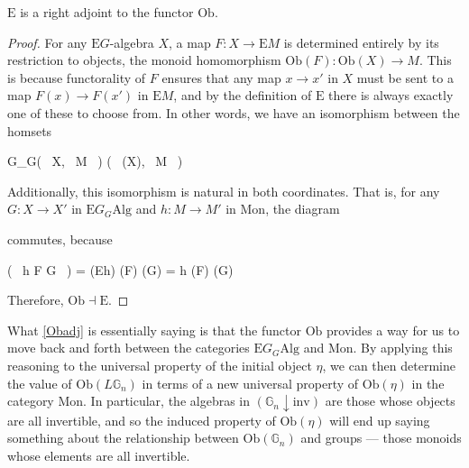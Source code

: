 \begin{prop}\label{Obadj} $\mathrm{E}$ is a right adjoint to the functor $\mathrm{Ob}$. 
\end{prop}
\begin{proof}
For any $\mathrm{E}G$-algebra $X$, a map $F: X \to \mathrm{E}M$ is determined entirely by its restriction to objects, the monoid homomorphism $\mathrm{Ob}(F) : \mathrm{Ob}(X) \to M$. This is because functorality of $F$ ensures that any map $x \to x'$ in $X$ must be sent to a map $F(x) \to F(x')$ in $\mathrm{E}M$, and by the definition of $\mathrm{E}$ there is always exactly one of these to choose from. In other words, we have an isomorphism between the homsets
\begin{eq*} G_G( \, X, \, M \, ) \quad \cong \quad {}( \, (X), \, M \, ) \end{eq*}
Additionally, this isomorphism is natural in both coordinates. That is, for any $G: X \to X'$ in $\mathrm{E}G_G\mathrm{Alg}$ and $h : M \to M'$ in $\mathrm{Mon}$, the diagram
\begin{eq*}  \end{eq*}
commutes, because
\begin{eq*} ( \, h \circ F \circ G \, ) \quad = \quad {}(Eh) \circ {}(F) \circ {}(G) \quad = \quad h \circ {}(F) \circ {}(G) \end{eq*}
Therefore, $\mathrm{Ob} \dashv \mathrm{E}$.
\end{proof}

What \cref{Obadj} is essentially saying is that the functor $\mathrm{Ob}$ provides a way for us to move back and forth between the categories $\mathrm{E}G_G\mathrm{Alg}$ and $\mathrm{Mon}$. By applying this reasoning to the universal property of the initial object $\eta$, we can then determine the value of $\mathrm{Ob}(L\mathbb{G}_n)$ in terms of a new universal property of $\mathrm{Ob}(\eta)$ in the category $\mathrm{Mon}$. In particular, the algebras in $(\mathbb{G}_n \downarrow \mathrm{inv})$ are those whose objects are all invertible, and so the induced property of $\mathrm{Ob}(\eta)$ will end up saying something about the relationship between $\mathrm{Ob}(\mathbb{G}_n)$ and groups --- those monoids whose elements are all invertible.

